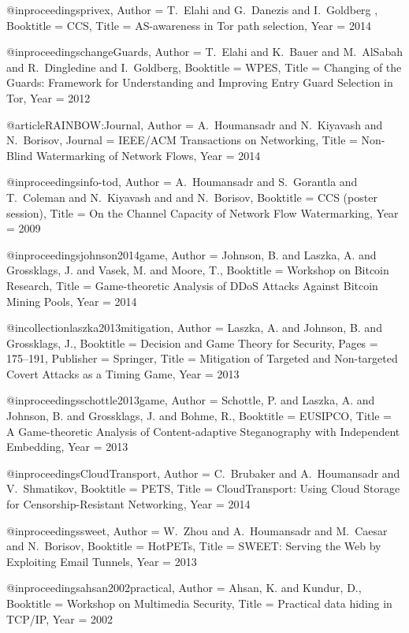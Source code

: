 {{{{{{{	@inproceedings{privex,
	Author = {T.~Elahi and G.~Danezis and I.~Goldberg	},
	Booktitle = {{CCS}},
	Title = {{AS-awareness in Tor path selection}},
	Year = {2014}}
	
	@inproceedings{changeGuards,
	Author = {T.~Elahi and K.~Bauer and M.~AlSabah and R.~Dingledine and I.~Goldberg},
	Booktitle = {{WPES}},
	Title = {{ Changing of the Guards: Framework for Understanding and Improving Entry Guard Selection in Tor}},
	Year = {2012}}
	
	@article{RAINBOW:Journal,
	Author = {A.~Houmansadr and N.~Kiyavash and N.~Borisov},
	Journal = {IEEE/ACM Transactions on Networking},
	Title = {{Non-Blind Watermarking of Network Flows}},
	Year = 2014}
	
	@inproceedings{info-tod,
	Author = {A.~Houmansadr and S.~Gorantla and T.~Coleman and N.~Kiyavash and and N.~Borisov},
	Booktitle = {{CCS (poster session)}},
	Title = {{On the Channel Capacity of Network Flow Watermarking}},
	Year = {2009}}
	
	@inproceedings{johnson2014game,
	Author = {Johnson, B. and Laszka, A. and Grossklags, J. and Vasek, M. and Moore, T.},
	Booktitle = {Workshop on Bitcoin Research},
	Title = {{Game-theoretic Analysis of DDoS Attacks Against Bitcoin Mining Pools}},
	Year = {2014}}
	
	@incollection{laszka2013mitigation,
	Author = {Laszka, A. and Johnson, B. and Grossklags, J.},
	Booktitle = {Decision and Game Theory for Security},
	Pages = {175--191},
	Publisher = {Springer},
	Title = {{Mitigation of Targeted and Non-targeted Covert Attacks as a Timing Game}},
	Year = {2013}}
	
	@inproceedings{schottle2013game,
	Author = {Schottle, P. and Laszka, A. and Johnson, B. and Grossklags, J. and Bohme, R.},
	Booktitle = {EUSIPCO},
	Title = {{A Game-theoretic Analysis of Content-adaptive Steganography with Independent Embedding}},
	Year = {2013}}
	
	@inproceedings{CloudTransport,
	Author = {C.~Brubaker and A.~Houmansadr and V.~Shmatikov},
	Booktitle = {PETS},
	Title = {{CloudTransport: Using Cloud Storage for Censorship-Resistant Networking}},
	Year = {2014}}
	
	@inproceedings{sweet,
	Author = {W.~Zhou and A.~Houmansadr and M.~Caesar and N.~Borisov},
	Booktitle = {HotPETs},
	Title = {{SWEET: Serving the Web by Exploiting Email Tunnels}},
	Year = {2013}}
	
	@inproceedings{ahsan2002practical,
	Author = {Ahsan, K. and Kundur, D.},
	Booktitle = {Workshop on Multimedia Security},
	Title = {{Practical data hiding in TCP/IP}},
	Year = {2002}}
	
}}}}}}}
